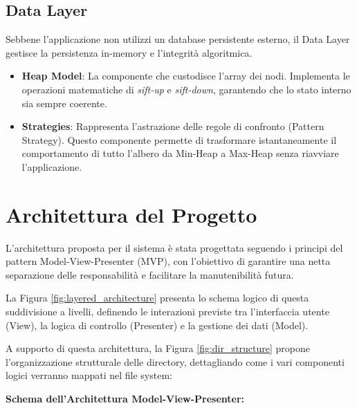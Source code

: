 \documentclass[openany]{theme/uniprthesis}
\begin{document}
\subsection{Data Layer}
Sebbene l'applicazione non utilizzi un database persistente esterno, il Data Layer gestisce la persistenza in-memory e l'integrità algoritmica.
\begin{itemize}
    \item \textbf{Heap Model}: La componente che custodisce l'array dei nodi. Implementa le operazioni matematiche di \textit{sift-up} e \textit{sift-down}, garantendo che lo stato interno sia sempre coerente.
    \item \textbf{Strategies}: Rappresenta l'astrazione delle regole di confronto (Pattern Strategy). Questo componente permette di trasformare istantaneamente il comportamento di tutto l'albero da Min-Heap a Max-Heap senza riavviare l'applicazione.
\end{itemize}


\newpage
\section{Architettura del Progetto}
L'architettura proposta per il sistema è stata progettata seguendo i principi del pattern Model-View-Presenter (MVP), con l'obiettivo di garantire una netta separazione delle responsabilità e facilitare la manutenibilità futura.

La Figura \ref{fig:layered_architecture} presenta lo schema logico di questa suddivisione a livelli, definendo le interazioni previste tra l'interfaccia utente (View), la logica di controllo (Presenter) e la gestione dei dati (Model).

A supporto di questa architettura, la Figura \ref{fig:dir_structure} propone l'organizzazione strutturale delle directory, dettagliando come i vari componenti logici verranno mappati nel file system:


\noindent\textbf{Schema dell'Architettura Model-View-Presenter:}
\end{document}
